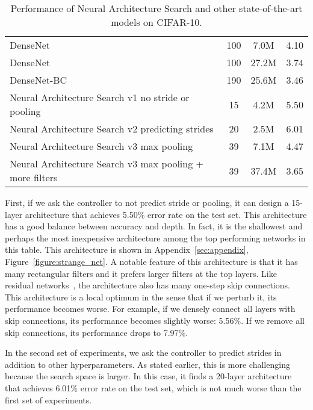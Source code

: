 \documentclass{article} \usepackage{iclr2017_conference,times}
\begin{document}
\begin{table}[h!]
{\begin{tabular}{l|cc|c}
DenseNet \citet{Huang2016Densely} & 100 & 7.0M &  4.10  \\
DenseNet  \citet{Huang2016Densely} & 100 & 27.2M &  3.74  \\ 
DenseNet-BC  \citet{Huang2016Densely2} & 190 & 25.6M &  3.46  \\ 
\midrule
Neural Architecture Search v1 no stride or pooling & 15 & 4.2M & 5.50   \\
Neural Architecture Search v2 predicting strides & 20 & 2.5M & 6.01  \\
Neural Architecture Search v3 max pooling & 39 & 7.1M & 4.47  \\
Neural Architecture Search v3 max pooling + more filters & 39 & 37.4M & 3.65 \\
\bottomrule
\end{tabular}}
\caption{Performance of Neural Architecture Search and other state-of-the-art models on CIFAR-10.}
\label{tab:cifar10}
\end{table}
 







 

First, if we ask the controller to not predict stride or pooling, it can design a 15-layer architecture that achieves 5.50\% error rate on the test set. This architecture has a good balance between accuracy and depth. In fact, it is the shallowest and perhaps the most inexpensive architecture among the top performing networks in this table. This architecture is shown in Appendix~\ref{sec:appendix}, Figure~\ref{figure:strange_net}. A notable feature of this architecture is that it has many rectangular filters and it prefers larger filters at the top layers. Like residual networks~\citep{he2015deep}, the architecture also has many one-step skip connections. This architecture is a local optimum in the sense that if we perturb it, its performance becomes worse. For example, if we densely connect all layers with skip connections, its performance becomes slightly worse: 5.56\%. If we remove all skip connections, its performance drops to 7.97\%. 


In the second set of experiments, we ask the controller to predict strides in addition to other hyperparameters. As stated earlier, this is more challenging because the search space is larger. In this case, it finds a 20-layer architecture that achieves 6.01\% error rate on the test set, which is not much worse than the first set of experiments. 
\end{document}

